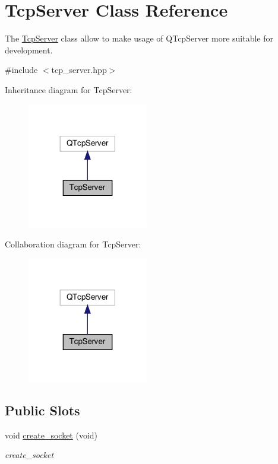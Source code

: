 \hypertarget{class_tcp_server}{}\section{Tcp\+Server Class Reference}
\label{class_tcp_server}


The \mbox{\hyperlink{class_tcp_server}{Tcp\+Server}} class allow to make usage of Q\+Tcp\+Server more suitable for development.  




{\ttfamily \#include $<$tcp\+\_\+server.\+hpp$>$}



Inheritance diagram for Tcp\+Server\+:\nopagebreak
\begin{figure}[H]
\begin{center}
\leavevmode
\includegraphics[width=149pt]{d8/dc4/class_tcp_server__inherit__graph}
\end{center}
\end{figure}


Collaboration diagram for Tcp\+Server\+:\nopagebreak
\begin{figure}[H]
\begin{center}
\leavevmode
\includegraphics[width=149pt]{dc/d71/class_tcp_server__coll__graph}
\end{center}
\end{figure}
\subsection*{Public Slots}
\begin{DoxyCompactItemize}
\item 
void \mbox{\hyperlink{class_tcp_server_a90ee8945eb2ceec552f5f7a850fd9dce}{create\+\_\+socket}} (void)
\begin{DoxyCompactList}\small\item\em create\+\_\+socket \end{DoxyCompactList}\end{DoxyCompactItemize}
